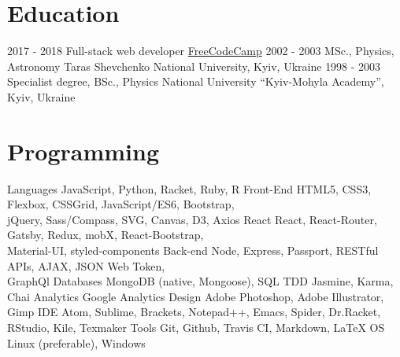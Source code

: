 \documentclass[letterpaper]{twentysecondcv} %
\begin{document}
\makeprofile %

\section{Education}

\begin{twenty} %
	\twentyitem
    	{2017 - 2018}
        {}
        {Full-stack web developer}
        {}
        {\href{http://www.freecodecamp.org/}{FreeCodeCamp}}
        {}
	\twentyitem
    	{2002 - 2003}
        {}
        {MSc., Physics, Astronomy}
        {}
        {Taras Shevchenko National University, Kyiv, Ukraine}
        {}
	\twentyitem
    	{1998 - 2003}
		{}
        {Specialist degree, BSc., Physics}
        {}
        {National University “Kyiv-Mohyla Academy”, Kyiv, Ukraine}
        {}
\end{twenty}


\section{Programming}
\begin{twentyshort} %
	\twentyitemshort
    	{Languages}
    	{JavaScript, Python, Racket, Ruby, R}
	\twentyitemshort
    	{Front-End}
        {HTML5, CSS3, Flexbox, CSSGrid, JavaScript/ES6, Bootstrap,\\
         jQuery, Sass/Compass, SVG, Canvas, D3, Axios}
     \twentyitemshort
    	{React}
		{React, React-Router, Gatsby, Redux, mobX, React-Bootstrap,\\
		Material-UI, styled-components}
     \twentyitemshort
    	{Back-end}
		{Node, Express, Passport, RESTful APIs, AJAX, JSON Web Token,
		\\ GraphQl}
     \twentyitemshort
    	{Databases}
		{MongoDB (native, Mongoose), SQL}
     \twentyitemshort
    	{TDD}
		{Jasmine, Karma, Chai}
     \twentyitemshort
    	{Analytics}
		{Google Analytics}
     \twentyitemshort
    	{Design}
		{Adobe Photoshop, Adobe Illustrator, Gimp}
     \twentyitemshort
    	{IDE}
		{Atom, Sublime, Brackets, Notepad++, Emacs, Spider, Dr.Racket,\\
		 RStudio, Kile, Texmaker}
     \twentyitemshort
    	{Tools}
		{Git, Github, Travis CI, Markdown, \LaTeX}
      \twentyitemshort
    	{OS}
		{Linux (preferable), Windows}
\end{twentyshort}
\end{document}
